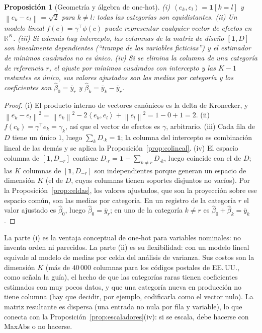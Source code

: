 \documentclass[11pt]{article}
\newtheorem{proposicion}[teorema]{Proposición}
\theoremstyle{definition}
\theoremstyle{remark}
\newcommand{\R}{\mathbb{R}}
\newcommand{\ind}[1]{\mathbf{1}\!\left[#1\right]}
\newcommand{\norm}[1]{\left\lVert #1\right\rVert}
\newcommand{\ip}[2]{\left\langle #1,#2\right\rangle}
\begin{document}
\begin{proposicion}[Geometría y álgebra de one-hot]\label{prop:onehot}
\noindent (i) $\ip{e_k}{e_l}=\ind{k=l}$ y $\norm{e_k-e_l}=\sqrt2$ para $k\ne l$: todas las categorías son equidistantes. (ii) Un modelo lineal $f(c)=\gamma^\top\phi(c)$ puede representar cualquier vector de efectos en $\R^K$. (iii) Si además hay intercepto, las columnas de la matriz de diseño $[\mathbf1,D]$ son linealmente dependientes (``trampa de las variables ficticias'') y el estimador de mínimos cuadrados no es único. (iv) Si se elimina la columna de una categoría de referencia $r$, el ajuste por mínimos cuadrados con intercepto y las $K-1$ restantes es único, sus valores ajustados son las medias por categoría y los coeficientes son $\hat\beta_0=\bar y_r$ y $\hat\beta_k=\bar y_k-\bar y_r$.
\end{proposicion}
\begin{proof}
\noindent (i) El producto interno de vectores canónicos es la delta de Kronecker, y $\norm{e_k-e_l}^2=\norm{e_k}^2-2\ip{e_k}{e_l}+\norm{e_l}^2=1-0+1=2$. (ii) $f(c_k)=\gamma^\top e_k=\gamma_k$, así que el vector de efectos es $\gamma$, arbitrario. (iii) Cada fila de $D$ tiene un único $1$, luego $\sum_kD_{\cdot k}=\mathbf1$; la columna del intercepto es combinación lineal de las demás y se aplica la Proposición~\ref{prop:colineal}. (iv) El espacio columna de $[\mathbf1,D_{-r}]$ contiene $D_{\cdot r}=\mathbf1-\sum_{k\ne r}D_{\cdot k}$, luego coincide con el de $D$; las $K$ columnas de $[\mathbf1,D_{-r}]$ son independientes porque generan un espacio de dimensión $K$ (el de $D$, cuyas columnas tienen soportes disjuntos no vacíos). Por la Proposición~\ref{prop:celdas}, los valores ajustados, que son la proyección sobre ese espacio común, son las medias por categoría. En un registro de la categoría $r$ el valor ajustado es $\hat\beta_0$, luego $\hat\beta_0=\bar y_r$; en uno de la categoría $k\ne r$ es $\hat\beta_0+\hat\beta_k=\bar y_k$.
\end{proof}

\noindent La parte (i) es la ventaja conceptual de one-hot para variables nominales: no inventa orden ni parecidos. La parte (ii) es su flexibilidad: con un modelo lineal equivale al modelo de medias por celda del análisis de varianza. Sus costos son la dimensión $K$ (más de $40\,000$ columnas para los códigos postales de EE.\,UU., como señala la guía), el hecho de que las categorías raras tienen coeficientes estimados con muy pocos datos, y que una categoría nueva en producción no tiene columna (hay que decidir, por ejemplo, codificarla como el vector nulo). La matriz resultante es dispersa (una entrada no nula por fila y variable), lo que conecta con la Proposición~\ref{prop:escaladores}(iv): si se escala, debe hacerse con MaxAbs o no hacerse.
\end{document}
